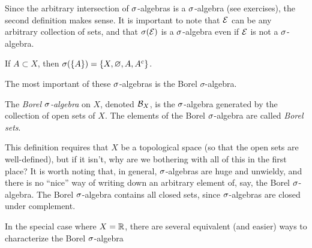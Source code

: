\documentclass[main.tex]{subfiles}
\begin{document}
Since the arbitrary intersection of ${\sigma}$-algebras is a ${\sigma}$-algebra (see exercises), the second definition makes sense. It is important to note that ${\mathcal E}$ can be any arbitrary collection of sets, and that ${\sigma}({\mathcal E})$ is a ${\sigma}$-algebra even if ${\mathcal E}$ is not a ${\sigma}$-algebra.

\begin{example}If $A \subset X$, then ${\sigma}(\{A\}) = \{ X, \varnothing, A, A^c \}$.
\end{example}

The most important of these ${\sigma}$-algebras is the Borel $\sigma$-algebra.

\begin{definition}
The \emph{Borel ${\sigma}$-algebra} on $X$, denoted ${\mathcal B}_X$, is the ${\sigma}$-algebra generated by the collection of open sets of $X$. The elements of the Borel ${\sigma}$-algebra are called \emph{Borel sets}.
\end{definition}

This definition requires that $X$ be a topological space (so that the open sets are well-defined), but if it isn't, why are we bothering with all of this in the first place? It is worth noting that, in general, ${\sigma}$-algebras are huge and unwieldy, and there is no ``nice'' way of writing down an arbitrary element of, say, the Borel ${\sigma}$-algebra. The Borel ${\sigma}$-algebra contains all closed sets, since ${\sigma}$-algebras are closed under complement. 

In the special case where $X = {\mathbb R}$, there are several equivalent (and easier) ways to characterize the Borel ${\sigma}$-algebra
\end{document}
